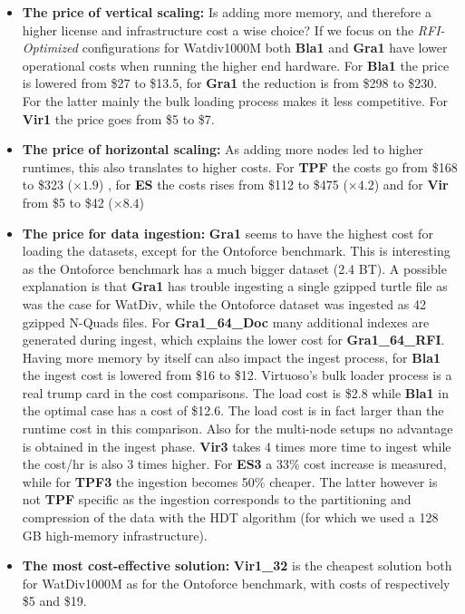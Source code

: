 \documentclass[twocolumn]{bmcart}%
\begin{document}
\begin{itemize}
	\item \textbf{The price of vertical scaling:} Is adding more memory, and therefore a higher license and infrastructure cost a wise choice? If we focus on the \emph{RFI-Optimized} configurations for Watdiv1000M both \textbf{Bla1} and \textbf{Gra1} have lower operational costs when running the higher end hardware. For \textbf{Bla1} the price is lowered from \$27 to \$13.5, for \textbf{Gra1} the reduction is from \$298 to \$230. For the latter mainly the bulk loading process makes it less competitive. For \textbf{Vir1} the price goes from \$5 to \$7.
	
	\item \textbf{The price of horizontal scaling:} As adding more nodes led to higher runtimes, this also translates to higher costs. For \textbf{TPF} the costs go from \$168 to \$323 ($\times 1.9$) , for \textbf{ES} the costs rises from \$112 to \$475 ($\times 4.2$) and for \textbf{Vir} from \$5 to \$42 ($\times 8.4$) 
	
	\item \textbf{The price for data ingestion:} \textbf{Gra1} seems to have the highest cost for loading the datasets, except for the Ontoforce benchmark. This is interesting as the Ontoforce benchmark has a much bigger dataset (2.4 BT). A possible explanation is that \textbf{Gra1} has trouble ingesting a single gzipped turtle file as was the case for WatDiv, while the Ontoforce dataset was ingested as 42 gzipped N-Quads files.
	For \textbf{Gra1\_64\_Doc} many additional indexes are generated during ingest, which explains the lower cost for \textbf{Gra1\_64\_RFI}. Having more memory by itself can also impact the ingest process, for \textbf{Bla1} the ingest cost is lowered from \$16 to \$12. Virtuoso's bulk loader process is a real trump 
	card in the cost comparisons. The load cost is \$2.8 while \textbf{Bla1} in the optimal case has a cost of \$12.6. The load cost is in fact larger than the runtime cost in this comparison.
	Also for the multi-node setups no advantage is obtained in the ingest phase. \textbf{Vir3} takes 4 times more time to ingest while the cost/hr is also 3 times higher. For \textbf{ES3} a 33\% cost increase is measured, while for \textbf{TPF3} the ingestion becomes 50\% cheaper. The latter however is not \textbf{TPF} specific as the ingestion corresponds to the partitioning and compression of the data with the HDT algorithm (for which we used a 128 GB high-memory infrastructure).
	
	\item \textbf{The most cost-effective solution:} \textbf{Vir1\_32} is the cheapest solution both for WatDiv1000M as for the Ontoforce benchmark, with costs of respectively \$5 and  \$19. 
\end{itemize}
\end{document}
